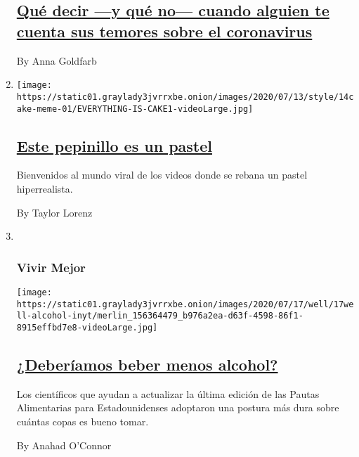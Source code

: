 \begin{enumerate}
  \hypertarget{quuxe9-decir-y-quuxe9-no-cuando-alguien-te-cuenta-sus-temores-sobre-el-coronavirus}{%
  \subsection{\texorpdfstring{\href{/es/2020/07/10/espanol/estilos-de-vida/miedo-coronavirus-temor.html}{Qué
  decir ---y qué no--- cuando alguien te cuenta sus temores sobre el
  coronavirus}}{Qué decir ---y qué no--- cuando alguien te cuenta sus temores sobre el coronavirus}}\label{quuxe9-decir-y-quuxe9-no-cuando-alguien-te-cuenta-sus-temores-sobre-el-coronavirus}}

  By Anna Goldfarb
\item
  \texttt{[image: https://static01.graylady3jvrrxbe.onion/images/2020/07/13/style/14cake-meme-01/EVERYTHING-IS-CAKE1-videoLarge.jpg]}

  \hypertarget{este-pepinillo-es-un-pastel}{%
  \subsection{\texorpdfstring{\href{/es/2020/07/14/espanol/estilos-de-vida/pastel-realista-meme.html}{Este
  pepinillo es un
  pastel}}{Este pepinillo es un pastel}}\label{este-pepinillo-es-un-pastel}}

  Bienvenidos al mundo viral de los videos donde se rebana un pastel
  hiperrealista.

  By Taylor Lorenz
\item ~
  \hypertarget{vivir-mejor}{%
  \subsubsection{Vivir Mejor}\label{vivir-mejor}}

  \texttt{[image: https://static01.graylady3jvrrxbe.onion/images/2020/07/17/well/17well-alcohol-inyt/merlin\_156364479\_b976a2ea-d63f-4598-86f1-8915effbd7e8-videoLarge.jpg]}

  \hypertarget{deberuxedamos-beber-menos-alcohol}{%
  \subsection{\texorpdfstring{\href{/es/2020/07/17/espanol/estilos-de-vida/tomar-menos.html}{¿Deberíamos
  beber menos
  alcohol?}}{¿Deberíamos beber menos alcohol?}}\label{deberuxedamos-beber-menos-alcohol}}

  Los científicos que ayudan a actualizar la última edición de las
  Pautas Alimentarias para Estadounidenses adoptaron una postura más
  dura sobre cuántas copas es bueno tomar.

  By Anahad O'Connor
\end{enumerate}

